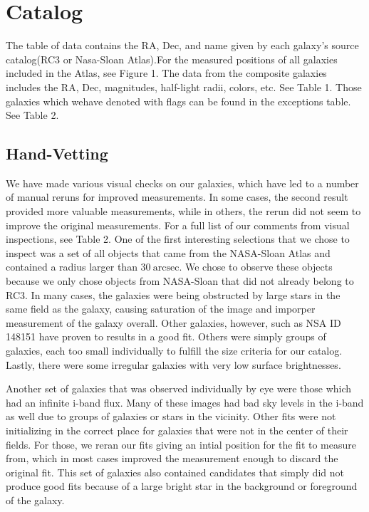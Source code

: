 \documentclass[12pt,preprint,pdftex]{aastex}
\newcommand{\units}[1]{\mathrm{#1}}
\renewcommand{\arcsec}{\units{arcsec}}
\begin{document}

\section{Catalog}
The table of data contains the RA, Dec, and name given by each galaxy's source catalog(RC3 or Nasa-Sloan Atlas).For the measured positions of all galaxies included in the Atlas, see Figure 1. The data from the composite galaxies includes the RA, Dec, magnitudes, half-light radii, colors, etc. See Table 1. Those galaxies which wehave denoted with flags can be found in the exceptions table. See Table 2. 


\subsection{Hand-Vetting}
We have made various visual checks on our galaxies, which have led to a number of manual reruns for improved measurements. In some cases, the second result provided more valuable measurements, while in others, the rerun did not seem to improve the original measurements. For a full list of our comments from visual inspections, see Table 2. One of the first interesting selections that we chose to inspect was a set of all objects that came from the NASA-Sloan Atlas and contained a radius larger than $30~\arcsec$. We chose to observe these objects because we only chose objects from NASA-Sloan that did not already belong to RC3. In many cases, the galaxies were being obstructed by large stars in the same field as the galaxy, causing saturation of the image and imporper measurement of the galaxy overall. Other galaxies, however, such as NSA ID 148151 have proven to results in a good fit. Others were simply groups of galaxies, each too small individually to fulfill the size criteria for our catalog. Lastly, there were some irregular galaxies with very low surface brightnesses.

Another set of galaxies that was observed individually by eye were those which had an infinite i-band flux. Many of these images had bad sky levels in the i-band as well due to groups of galaxies or stars in the vicinity. Other fits were not initializing in the correct place for galaxies that were not in the center of their fields. For those, we reran our fits giving an intial position for the fit to measure from, which in most cases improved the measurement enough to discard the original fit. This set of galaxies also contained candidates that simply did not produce good fits because of a large bright star in the background or foreground of the galaxy.
\end{document}
